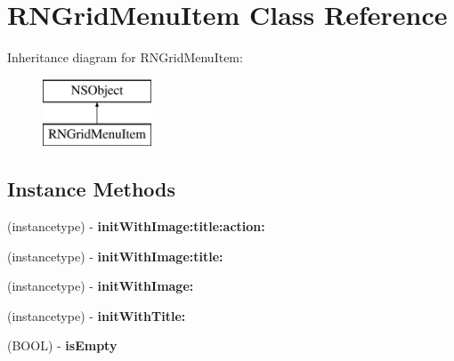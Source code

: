 \hypertarget{interface_r_n_grid_menu_item}{}\section{R\+N\+Grid\+Menu\+Item Class Reference}
\label{interface_r_n_grid_menu_item}
Inheritance diagram for R\+N\+Grid\+Menu\+Item\+:\begin{figure}[H]
\begin{center}
\leavevmode
\includegraphics[height=2.000000cm]{interface_r_n_grid_menu_item}
\end{center}
\end{figure}
\subsection*{Instance Methods}
\begin{DoxyCompactItemize}
\item 
\hypertarget{interface_r_n_grid_menu_item_a03b16d346706e0116211d586c29c6935}{}(instancetype) -\/ {\bfseries init\+With\+Image\+:title\+:action\+:}\label{interface_r_n_grid_menu_item_a03b16d346706e0116211d586c29c6935}

\item 
\hypertarget{interface_r_n_grid_menu_item_af6a360aca5426a2916fcfc8739df867b}{}(instancetype) -\/ {\bfseries init\+With\+Image\+:title\+:}\label{interface_r_n_grid_menu_item_af6a360aca5426a2916fcfc8739df867b}

\item 
\hypertarget{interface_r_n_grid_menu_item_af2b6eedad6be2f142b97069737f05c25}{}(instancetype) -\/ {\bfseries init\+With\+Image\+:}\label{interface_r_n_grid_menu_item_af2b6eedad6be2f142b97069737f05c25}

\item 
\hypertarget{interface_r_n_grid_menu_item_a47ed4bc6b4c8b316a22de8c6a063e535}{}(instancetype) -\/ {\bfseries init\+With\+Title\+:}\label{interface_r_n_grid_menu_item_a47ed4bc6b4c8b316a22de8c6a063e535}

\item 
\hypertarget{interface_r_n_grid_menu_item_a9c62023ef64845f04dc71c7f311d4ee1}{}(B\+O\+O\+L) -\/ {\bfseries is\+Empty}\label{interface_r_n_grid_menu_item_a9c62023ef64845f04dc71c7f311d4ee1}

\end{DoxyCompactItemize}
